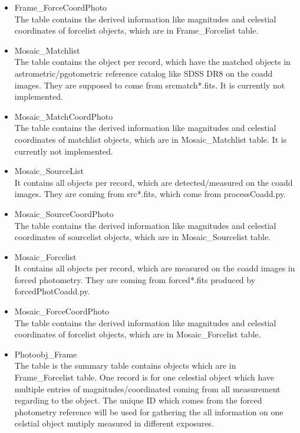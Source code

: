 \documentclass[12pt]{article}
\begin{document}
\begin{enumerate}
\begin{itemize}
\item Frame\_ForceCoordPhoto\\
The table contains the derived information like magnitudes and celestial coordinates of forcelist 
objects, which are in Frame\_Forcelist table. 

\item Mosaic\_Matchlist\\
The table contains the object per record, which have the matched objects in astrometric/pgotometric 
reference catalog like SDSS DR8 on the coadd images. They are supposed to come from srcmatch*.fits. 
It is currently not implemented. 

\item Mosaic\_MatchCoordPhoto\\
The table contains the derived information like magnitudes and celestial coordinates of matchlist 
objects, which are in Mosaic\_Matchlist table. It is currently not implemented.  

\item Mosaic\_SourceList\\
It contains all objects per record, which are detected/measured on the coadd images. They 
are coming from src*.fits, which come from processCoadd.py. 

\item Mosaic\_SourceCoordPhoto\\
The table contains the derived information like magnitudes and celestial coordinates of sourcelist 
objects, which are in Mosaic\_Sourcelist table. 

\item Mosaic\_Forcelist\\
It contains all objects per record, which are measured on the coadd images in forced photometry. 
They are coming from forced*.fits produced by forcedPhotCoadd.py. 

\item Mosaic\_ForceCoordPhoto\\
The table contains the derived information like magnitudes and celestial coordinates of forcelist 
objects, which are in Mosaic\_Forcelist table. 

\item Photoobj\_Frame\\
The table is the summary table contains objects which are in Frame\_Forcelist table. One record is 
for one celestial object which have multiple entries of magnitudes/coordinated coming from all 
measurement regarding to the object. The unique ID which comes from the forced photometry reference 
will be used for gathering the all information on one celstial object mutiply measured in different 
exposures. 


\end{itemize}
\end{enumerate}
\end{document}
